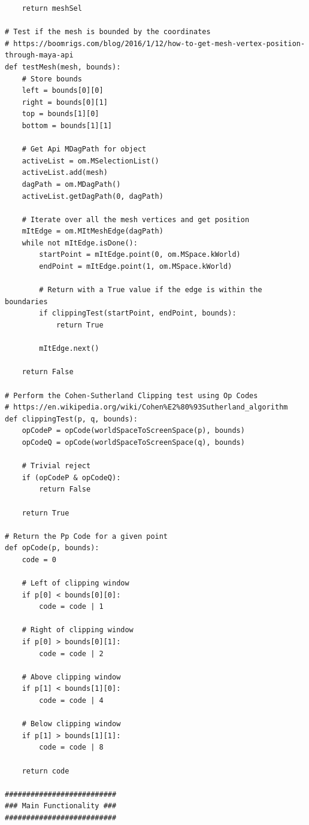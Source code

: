 \documentclass[conference]{IEEEtran}
\begin{document}
{\begin{verbatim}
    return meshSel
    
# Test if the mesh is bounded by the coordinates
# https://boomrigs.com/blog/2016/1/12/how-to-get-mesh-vertex-position-through-maya-api
def testMesh(mesh, bounds):    
    # Store bounds
    left = bounds[0][0]
    right = bounds[0][1]
    top = bounds[1][0]
    bottom = bounds[1][1]
    
    # Get Api MDagPath for object
    activeList = om.MSelectionList()
    activeList.add(mesh)
    dagPath = om.MDagPath()
    activeList.getDagPath(0, dagPath)

    # Iterate over all the mesh vertices and get position
    mItEdge = om.MItMeshEdge(dagPath)
    while not mItEdge.isDone():
        startPoint = mItEdge.point(0, om.MSpace.kWorld)
        endPoint = mItEdge.point(1, om.MSpace.kWorld)
        
        # Return with a True value if the edge is within the boundaries
        if clippingTest(startPoint, endPoint, bounds):
            return True
                
        mItEdge.next()
    
    return False
    
# Perform the Cohen-Sutherland Clipping test using Op Codes
# https://en.wikipedia.org/wiki/Cohen%E2%80%93Sutherland_algorithm
def clippingTest(p, q, bounds):
    opCodeP = opCode(worldSpaceToScreenSpace(p), bounds)
    opCodeQ = opCode(worldSpaceToScreenSpace(q), bounds)
        
    # Trivial reject
    if (opCodeP & opCodeQ):
        return False
        
    return True

# Return the Pp Code for a given point
def opCode(p, bounds):
    code = 0
    
    # Left of clipping window
    if p[0] < bounds[0][0]:
        code = code | 1
    
    # Right of clipping window
    if p[0] > bounds[0][1]:
        code = code | 2
        
    # Above clipping window
    if p[1] < bounds[1][0]:
        code = code | 4
        
    # Below clipping window
    if p[1] > bounds[1][1]:
        code = code | 8
        
    return code

##########################
### Main Functionality ###
##########################


\end{verbatim}}
\end{document}
